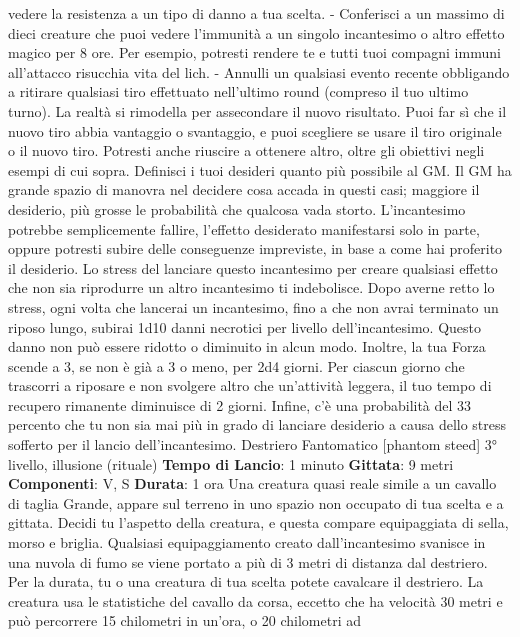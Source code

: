 \begin{multicols}{2}
vedere la resistenza a un tipo di danno a tua scelta.
- Conferisci a un massimo di dieci creature che puoi
vedere l’immunità a un singolo incantesimo o altro
effetto magico per 8 ore. Per esempio, potresti
rendere te e tutti tuoi compagni immuni all’attacco
risucchia vita del lich.
- Annulli un qualsiasi evento recente obbligando a
ritirare qualsiasi tiro effettuato nell’ultimo round
(compreso il tuo ultimo turno). La realtà si rimodella
per assecondare il nuovo risultato. Puoi far sì che il
nuovo tiro abbia vantaggio o svantaggio, e puoi
scegliere se usare il tiro originale o il nuovo tiro.
Potresti anche riuscire a ottenere altro, oltre gli obiettivi
negli esempi di cui sopra. Definisci i tuoi desideri
quanto più possibile al GM. Il GM ha grande spazio di
manovra nel decidere cosa accada in questi casi;
maggiore il desiderio, più grosse le probabilità che
qualcosa vada storto. L’incantesimo potrebbe
semplicemente fallire, l’effetto desiderato manifestarsi
solo in parte, oppure potresti subire delle conseguenze
impreviste, in base a come hai proferito il desiderio.
Lo stress del lanciare questo incantesimo per creare
qualsiasi effetto che non sia riprodurre un altro
incantesimo ti indebolisce. Dopo averne retto lo stress,
ogni volta che lancerai un incantesimo, fino a che non
avrai terminato un riposo lungo, subirai 1d10 danni
necrotici per livello dell’incantesimo. Questo danno non
può essere ridotto o diminuito in alcun modo. Inoltre, la
tua Forza scende a 3, se non è già a 3 o meno, per 2d4
giorni. Per ciascun giorno che trascorri a riposare e non
svolgere altro che un’attività leggera, il tuo tempo di
recupero rimanente diminuisce di 2 giorni. Infine, c’è
una probabilità del 33 percento che tu non sia mai più in
grado di lanciare desiderio a causa dello stress sofferto
per il lancio dell’incantesimo.
Destriero Fantomatico
[phantom steed]
3° livello, illusione (rituale)
\textbf{Tempo di Lancio}: 1 minuto
\textbf{Gittata}: 9 metri
\textbf{Componenti}: V, S
\textbf{Durata}: 1 ora
Una creatura quasi reale simile a un cavallo di taglia
Grande, appare sul terreno in uno spazio non occupato
di tua scelta e a gittata. Decidi tu l’aspetto della
creatura, e questa compare equipaggiata di sella,
morso e briglia. Qualsiasi equipaggiamento creato
dall’incantesimo svanisce in una nuvola di fumo se
viene portato a più di 3 metri di distanza dal destriero.
Per la durata, tu o una creatura di tua scelta potete
cavalcare il destriero. La creatura usa le statistiche del
cavallo da corsa, eccetto che ha velocità 30 metri e può
percorrere 15 chilometri in un’ora, o 20 chilometri ad

\end{multicols}
